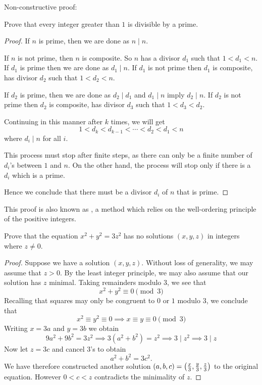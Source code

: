 Non-constructive proof:
\begin{exercise}
Prove that every integer greater than $1$ is divisible by a prime.
\end{exercise}

\begin{proof}
If $n$ is prime, then we are done as $n\mid n$.

If $n$ is not prime, then $n$ is composite. So $n$ has a divisor $d_1$ such that $1<d_1<n$. If $d_1$ is prime then we are done as $d_1\mid n$. If $d_1$ is not prime then $d_1$ is composite, has divisor $d_2$ such that $1<d_2<n$.

If $d_2$ is prime, then we are done as $d_2\mid d_1$ and $d_1\mid n$ imply $d_2\mid n$. If $d_2$ is not prime then $d_2$ is composite, has divisor $d_3$ such that $1<d_3<d_2$.

Continuing in this manner after $k$ times, we will get
\[ 1<d_k<d_{k-1}<\cdots<d_2<d_1<n \]
where $d_i\mid n$ for all $i$.

This process must stop after finite steps, as there can only be a finite number of $d_i$'s between $1$ and $n$. On the other hand, the process will stop only if there is a $d_i$ which is a prime. 

Hence we conclude that there must be a divisor $d_i$ of $n$ that is prime.
\end{proof}

\begin{remark}
This proof is also known as , a method which relies on the well-ordering principle of the positive integers.
\end{remark}

\begin{exercise}
Prove that the equation $x^2+y^2=3z^2$ has no solutions $(x,y,z)$ in integers where $z\neq0$.
\end{exercise}

\begin{proof}
Suppose we have a solution $(x,y,z)$. Without loss of generality, we may assume that $z>0$. By the least integer principle, we may also assume that our solution has $z$ minimal. Taking remainders modulo $3$, we see that
\[ x^2+y^2\equiv0\pmod3 \]
Recalling that squares may only be congruent to $0$ or $1$ modulo $3$, we conclude that
\[ x^2\equiv y^2\equiv 0 \implies x \equiv y \equiv 0 \pmod 3 \]
Writing $x=3a$ and $y=3b$ we obtain
\[ 9a^2+9b^2=3z^2 \implies 3(a^2+b^2)=z^2 \implies 3\mid z^2 \implies 3\mid z \]
Now let $z=3c$ and cancel $3$'s to obtain
\[ a^2+b^2=3c^2. \]
We have therefore constructed another solution $(a,b,c)=\left(\frac{x}{3},\frac{y}{3},\frac{z}{3}\right)$ to the original equation. However $0<c<z$ contradicts the minimality of $z$.
\end{proof}

